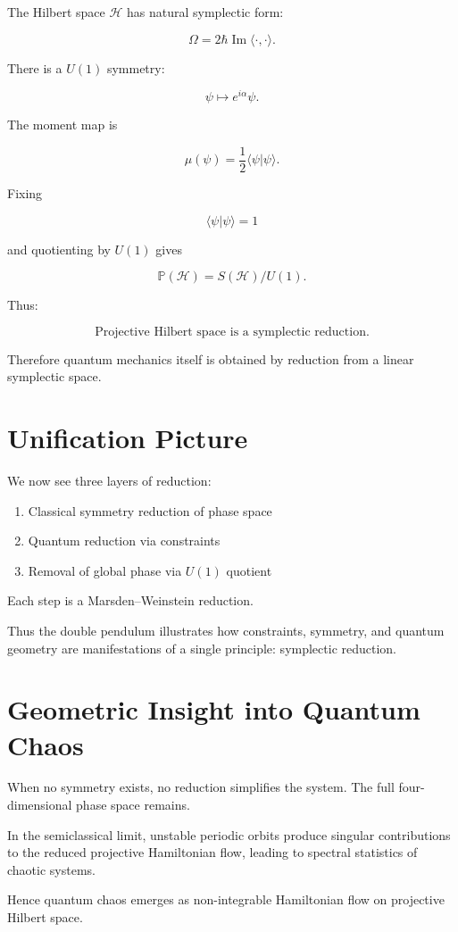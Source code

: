 \documentclass[11pt]{article}
\begin{document}
The Hilbert space $\mathcal{H}$ has natural symplectic form:

\[
\Omega = 2\hbar \operatorname{Im} \langle \cdot , \cdot \rangle.
\]

There is a $U(1)$ symmetry:

\[
\psi \mapsto e^{i\alpha}\psi.
\]

The moment map is

\[
\mu(\psi) = \frac12 \langle \psi | \psi \rangle.
\]

Fixing

\[
\langle \psi | \psi \rangle = 1
\]

and quotienting by $U(1)$ gives

\[
\mathbb{P}(\mathcal{H})
=
S(\mathcal{H}) / U(1).
\]

Thus:

\[
\boxed{
\text{Projective Hilbert space is a symplectic reduction.}
}
\]

Therefore quantum mechanics itself is obtained
by reduction from a linear symplectic space.

\section{Unification Picture}

We now see three layers of reduction:

\begin{enumerate}
\item Classical symmetry reduction of phase space
\item Quantum reduction via constraints
\item Removal of global phase via $U(1)$ quotient
\end{enumerate}

Each step is a Marsden--Weinstein reduction.

Thus the double pendulum illustrates
how constraints, symmetry, and quantum geometry
are manifestations of a single principle:
symplectic reduction.

\section{Geometric Insight into Quantum Chaos}

When no symmetry exists,
no reduction simplifies the system.
The full four-dimensional phase space remains.

In the semiclassical limit,
unstable periodic orbits
produce singular contributions to the
reduced projective Hamiltonian flow,
leading to spectral statistics of chaotic systems.

Hence quantum chaos emerges as
non-integrable Hamiltonian flow
on projective Hilbert space.
\end{document}
